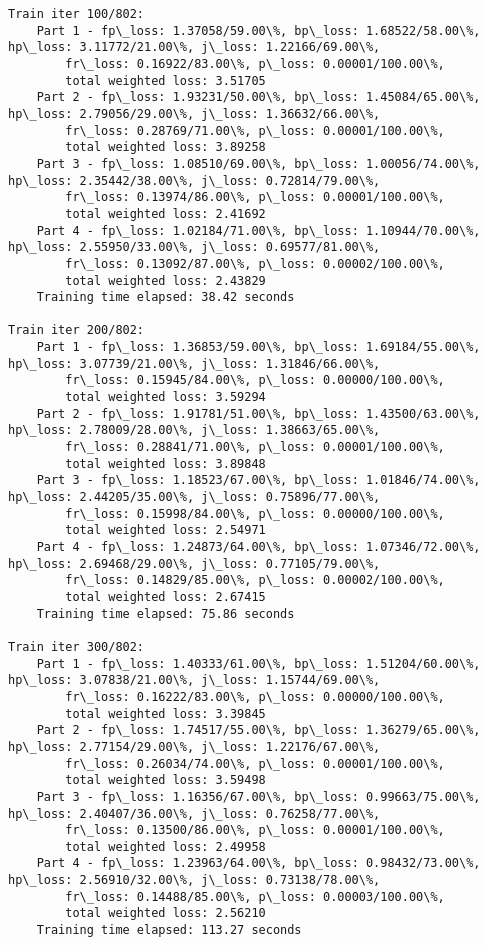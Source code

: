 \documentclass[11pt]{article}
\begin{document}
\begin{Verbatim}[commandchars=\\\{\}]
Train iter 100/802:
	Part 1 - fp\_loss: 1.37058/59.00\%, bp\_loss: 1.68522/58.00\%, hp\_loss: 3.11772/21.00\%, j\_loss: 1.22166/69.00\%, 
		fr\_loss: 0.16922/83.00\%, p\_loss: 0.00001/100.00\%, 
		total weighted loss: 3.51705
	Part 2 - fp\_loss: 1.93231/50.00\%, bp\_loss: 1.45084/65.00\%, hp\_loss: 2.79056/29.00\%, j\_loss: 1.36632/66.00\%, 
		fr\_loss: 0.28769/71.00\%, p\_loss: 0.00001/100.00\%, 
		total weighted loss: 3.89258
	Part 3 - fp\_loss: 1.08510/69.00\%, bp\_loss: 1.00056/74.00\%, hp\_loss: 2.35442/38.00\%, j\_loss: 0.72814/79.00\%, 
		fr\_loss: 0.13974/86.00\%, p\_loss: 0.00001/100.00\%, 
		total weighted loss: 2.41692
	Part 4 - fp\_loss: 1.02184/71.00\%, bp\_loss: 1.10944/70.00\%, hp\_loss: 2.55950/33.00\%, j\_loss: 0.69577/81.00\%, 
		fr\_loss: 0.13092/87.00\%, p\_loss: 0.00002/100.00\%, 
		total weighted loss: 2.43829
	Training time elapsed: 38.42 seconds

Train iter 200/802:
	Part 1 - fp\_loss: 1.36853/59.00\%, bp\_loss: 1.69184/55.00\%, hp\_loss: 3.07739/21.00\%, j\_loss: 1.31846/66.00\%, 
		fr\_loss: 0.15945/84.00\%, p\_loss: 0.00000/100.00\%, 
		total weighted loss: 3.59294
	Part 2 - fp\_loss: 1.91781/51.00\%, bp\_loss: 1.43500/63.00\%, hp\_loss: 2.78009/28.00\%, j\_loss: 1.38663/65.00\%, 
		fr\_loss: 0.28841/71.00\%, p\_loss: 0.00001/100.00\%, 
		total weighted loss: 3.89848
	Part 3 - fp\_loss: 1.18523/67.00\%, bp\_loss: 1.01846/74.00\%, hp\_loss: 2.44205/35.00\%, j\_loss: 0.75896/77.00\%, 
		fr\_loss: 0.15998/84.00\%, p\_loss: 0.00000/100.00\%, 
		total weighted loss: 2.54971
	Part 4 - fp\_loss: 1.24873/64.00\%, bp\_loss: 1.07346/72.00\%, hp\_loss: 2.69468/29.00\%, j\_loss: 0.77105/79.00\%, 
		fr\_loss: 0.14829/85.00\%, p\_loss: 0.00002/100.00\%, 
		total weighted loss: 2.67415
	Training time elapsed: 75.86 seconds

Train iter 300/802:
	Part 1 - fp\_loss: 1.40333/61.00\%, bp\_loss: 1.51204/60.00\%, hp\_loss: 3.07838/21.00\%, j\_loss: 1.15744/69.00\%, 
		fr\_loss: 0.16222/83.00\%, p\_loss: 0.00000/100.00\%, 
		total weighted loss: 3.39845
	Part 2 - fp\_loss: 1.74517/55.00\%, bp\_loss: 1.36279/65.00\%, hp\_loss: 2.77154/29.00\%, j\_loss: 1.22176/67.00\%, 
		fr\_loss: 0.26034/74.00\%, p\_loss: 0.00001/100.00\%, 
		total weighted loss: 3.59498
	Part 3 - fp\_loss: 1.16356/67.00\%, bp\_loss: 0.99663/75.00\%, hp\_loss: 2.40407/36.00\%, j\_loss: 0.76258/77.00\%, 
		fr\_loss: 0.13500/86.00\%, p\_loss: 0.00001/100.00\%, 
		total weighted loss: 2.49958
	Part 4 - fp\_loss: 1.23963/64.00\%, bp\_loss: 0.98432/73.00\%, hp\_loss: 2.56910/32.00\%, j\_loss: 0.73138/78.00\%, 
		fr\_loss: 0.14488/85.00\%, p\_loss: 0.00003/100.00\%, 
		total weighted loss: 2.56210
	Training time elapsed: 113.27 seconds


\end{Verbatim}
\end{document}
